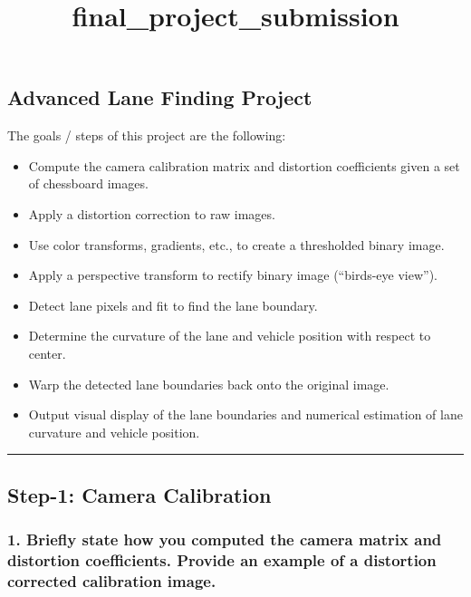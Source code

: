 \documentclass[11pt]{article}
\title{final\_project\_submission}
\providecommand{\tightlist}{%
      \setlength{\itemsep}{0pt}\setlength{\parskip}{0pt}}
\begin{document}
    
    
    \maketitle
    
    

    
    \hypertarget{advanced-lane-finding-project}{%
\subsection{Advanced Lane Finding
Project}\label{advanced-lane-finding-project}}

The goals / steps of this project are the following:

\begin{itemize}
\tightlist
\item
  Compute the camera calibration matrix and distortion coefficients
  given a set of chessboard images.
\item
  Apply a distortion correction to raw images.
\item
  Use color transforms, gradients, etc., to create a thresholded binary
  image.
\item
  Apply a perspective transform to rectify binary image (``birds-eye
  view'').
\item
  Detect lane pixels and fit to find the lane boundary.
\item
  Determine the curvature of the lane and vehicle position with respect
  to center.
\item
  Warp the detected lane boundaries back onto the original image.
\item
  Output visual display of the lane boundaries and numerical estimation
  of lane curvature and vehicle position.
\end{itemize}

\begin{center}\rule{0.5\linewidth}{\linethickness}\end{center}

\hypertarget{step-1-camera-calibration}{%
\subsection{Step-1: Camera
Calibration}\label{step-1-camera-calibration}}

\hypertarget{briefly-state-how-you-computed-the-camera-matrix-and-distortion-coefficients.-provide-an-example-of-a-distortion-corrected-calibration-image.}{%
\subsubsection{1. Briefly state how you computed the camera matrix and
distortion coefficients. Provide an example of a distortion corrected
calibration
image.}\label{briefly-state-how-you-computed-the-camera-matrix-and-distortion-coefficients.-provide-an-example-of-a-distortion-corrected-calibration-image.}}
\end{document}
